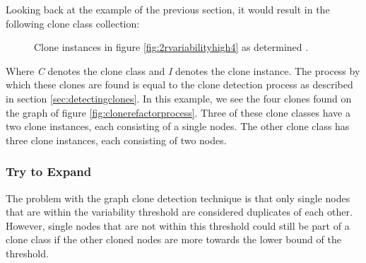 Looking back at the example of the previous section, it would result in the following clone class collection:
\begin{figure}[H]
\begin{parcolumns}{3}
\end{parcolumns}
\caption{Clone instances in figure \ref{fig:2rvariabilityhigh4} as determined .}
\label{fig:2rvariabilityhigh5}
\end{figure}

Where \textit{C} denotes the clone class and \textit{I} denotes the clone instance. The process by which these clones are found is equal to the clone detection process as described in section \ref{sec:detectingclones}. In this example, we see the four clones found on the graph of figure \ref{fig:clonerefactorprocess}. Three of these clone classes have a two clone instances, each consisting of a single nodes. The other clone class has three clone instances, each consisting of two nodes.

\subsubsection{Try to Expand}
The problem with the graph clone detection technique is that only single nodes that are within the variability threshold are considered duplicates of each other. However, single nodes that are not within this threshold could still be part of a clone class if the other cloned nodes are more towards the lower bound of the threshold.

